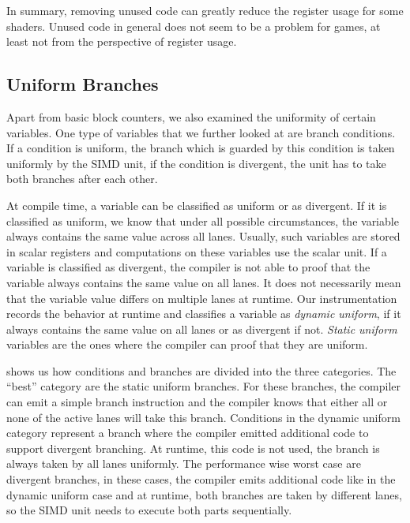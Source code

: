 In summary, removing unused code can greatly reduce the register usage for some shaders.
Unused code in general does not seem to be a problem for games, at least not from the perspective of register usage.

\subsection{Uniform Branches}
\label{sub:eval_uniform_branches}
Apart from basic block counters, we also examined the uniformity of certain variables.
One type of variables that we further looked at are branch conditions.
If a condition is uniform, the branch which is guarded by this condition is taken uniformly by the SIMD unit, if the condition is divergent, the unit has to take both branches after each other.

At compile time, a variable can be classified as uniform or as divergent.
If it is classified as uniform, we know that under all possible circumstances, the variable always contains the same value across all lanes.
Usually, such variables are stored in scalar registers and computations on these variables use the scalar unit.
If a variable is classified as divergent, the compiler is not able to proof that the variable always contains the same value on all lanes.
It does not necessarily mean that the variable value differs on multiple lanes at runtime.
Our instrumentation records the behavior at runtime and classifies a variable as \emph{dynamic uniform}, if it always contains the same value on all lanes or as divergent if not.
\emph{Static uniform} variables are the ones where the compiler can proof that they are uniform.



 shows us how conditions and branches are divided into the three categories.
The \enquote{best} category are the static uniform branches.
For these branches, the compiler can emit a simple branch instruction and the compiler knows that either all or none of the active lanes will take this branch.
Conditions in the dynamic uniform category represent a branch where the compiler emitted additional code to support divergent branching.
At runtime, this code is not used, the branch is always taken by all lanes uniformly.
The performance wise worst case are divergent branches, in these cases, the compiler emits additional code like in the dynamic uniform case and at runtime, both branches are taken by different lanes, so the SIMD unit needs to execute both parts sequentially.


